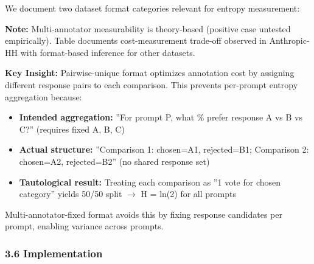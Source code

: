 We document two dataset format categories relevant for entropy measurement:

\begin{table}[htbp]
\centering
{}
\end{table}

\textbf{Note:} Multi-annotator measurability is theory-based (positive case untested empirically). Table documents cost-measurement trade-off observed in Anthropic-HH with format-based inference for other datasets.

\textbf{Key Insight:} Pairwise-unique format optimizes annotation cost by assigning different response pairs to each comparison. This prevents per-prompt entropy aggregation because:

\begin{itemize}
\item \textbf{Intended aggregation:} ''For prompt P, what \% prefer response A vs B vs C?'' (requires fixed {A, B, C})
\item \textbf{Actual structure:} ''Comparison 1: chosen=A1, rejected=B1; Comparison 2: chosen=A2, rejected=B2'' (no shared response set)
\item \textbf{Tautological result:} Treating each comparison as ''1 vote for chosen category'' yields 50/50 split $\rightarrow$ H = ln(2) for all prompts
\end{itemize}

Multi-annotator-fixed format avoids this by fixing response candidates per prompt, enabling variance across prompts.

\subsubsection{3.6 Implementation}

